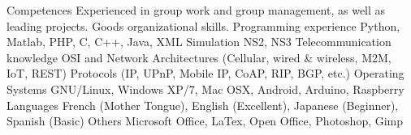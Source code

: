 \begin{cvskills}
  \cvskill
    {Competences}
    {Experienced in group work and group management, as well as leading projects.}
  \cvskill
    {}
    {Goods organizational skills.}
  \cvskill
    {Programming experience}
    {Python, Matlab, PHP, C, C++, Java, XML}
  \cvskill
    {Simulation}
    {NS2, NS3}
  \cvskill
    {Telecommunication knowledge}
    {OSI and Network Architectures (Cellular, wired \& wireless, M2M, IoT, REST)}
  \cvskill
  	{}
  	{Protocols (IP, UPnP, Mobile IP, CoAP, RIP, BGP, etc.)}
  \cvskill
    {Operating Systems}
    {GNU/Linux, Windows XP/7, Mac OSX, Android, Arduino, Raspberry}
  \cvskill
    {Languages}
    {French (Mother Tongue), English (Excellent), Japanese (Beginner), Spanish (Basic)}
  \cvskill
    {Others}
    {Microsoft Office, LaTex, Open Office, Photoshop, Gimp}
\end{cvskills}
